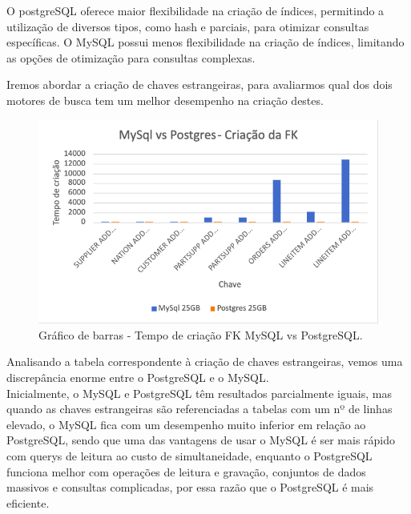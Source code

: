 \documentclass{article}
\begin{document}
\texttt{}\par O postgreSQL oferece maior flexibilidade na criação de índices, permitindo a utilização de diversos tipos, como hash e parciais, para otimizar consultas específicas. O MySQL possui menos flexibilidade na criação de índices, limitando as opções de otimização para consultas complexas.\\

\texttt{}\par Iremos abordar a criação de chaves estrangeiras, para avaliarmos qual dos dois motores de busca tem um melhor desempenho na criação destes.\\


\begin{figure}[H]
  \centering
  \includegraphics[width=\textwidth]{Graphs/FKCreation.png}
  \caption{Gráfico de barras - Tempo de criação FK MySQL vs PostgreSQL.}
  \label{fig:PKCreation2}
\end{figure}

Analisando a tabela correspondente à criação de chaves estrangeiras, vemos uma discrepância enorme entre o PostgreSQL e o MySQL.\\

Inicialmente, o MySQL e PostgreSQL têm resultados parcialmente iguais, mas quando as chaves estrangeiras são referenciadas a tabelas com um nº de linhas elevado, o MySQL fica com um desempenho muito inferior em relação ao PostgreSQL, sendo que uma das vantagens de usar o MySQL é  ser mais rápido com querys de leitura ao custo de simultaneidade, enquanto o PostgreSQL funciona melhor com operações de leitura e gravação, conjuntos de dados massivos e consultas complicadas, por essa razão que o PostgreSQL é mais eficiente.\\
\end{document}
